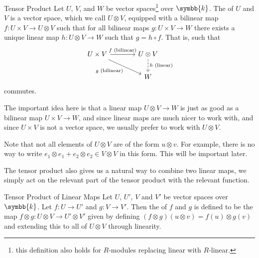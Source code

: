 \documentclass[fleqn]{NotesClass}
\renewcommand{\field}{\symbb{k}}
\renewcommand{\ve}[1]{e_{#1}}
\begin{document}
    \begin{dfn}{Tensor Product}{}
        Let \(U\), \(V\), and \(W\) be vector spaces\footnote{this definition also holds for \(R\)-modules replacing linear with \(R\)-linear.} over \(\field\).
        The  of \(U\) and \(V\) is a vector space, which we call \(U \otimes V\), equipped with a bilinear map \(f \colon U \times V \to U \otimes V\) such that for all bilinear maps \(g \colon U \times V \to W\) there exists a unique linear map \(h \colon U \otimes V \to W\) such that \(g = h \circ f\).
        That is, such that
        \begin{equation}
            \begin{tikzcd}[column sep=large]
                U \times V \arrow[r, "f \text{ (bilinear)}"] \arrow[dr, "g \text{ (bilinear)}"'] & U \otimes V \arrow[d, dashed, "h \text{ (linear)}"]\\
                & W
            \end{tikzcd}
        \end{equation}
        commutes.
    \end{dfn}
    
    The important idea here is that a linear map \(U \otimes V \to W\) is just as good as a bilinear map \(U \times V \to W\), and since linear maps are much nicer to work with, and since \(U \times V\) is not a vector space, we usually prefer to work with \(U \otimes V\).
    
    Note that not all elements of \(U \otimes V\) are of the form \(u \otimes v\).
    For example, there is no way to write \(\ve{1} \otimes \ve{1} + \ve{2} \otimes \ve{2} \in V \otimes V\) in this form.
    This will be important later.
    
    The tensor product also gives us a natural way to combine two linear maps, we simply act on the relevant part of the tensor product with the relevant function.
    
    \begin{dfn}{Tensor Product of Linear Maps}{}
        Let \(U\), \(U'\), \(V\) and \(V'\) be vector spaces over \(\field\).
        Let \(f \colon U \to U'\) and \(g \colon V \to V'\).
        Then the  of \(f\) and \(g\) is defined to be the map \(f \otimes g \colon U \otimes V \to U' \otimes V'\) given by defining \((f \otimes g)(u \otimes v) = f(u) \otimes g(v)\) and extending this to all of \(U \otimes V\) through linearity.
    \end{dfn}
    
\end{document}
